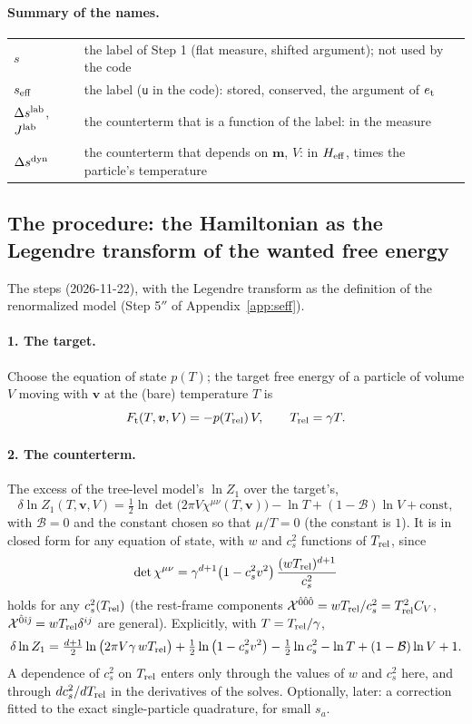 \documentclass[11pt,aps,preprint,nofootinbib,superscriptaddress,tightenlines]{revtex4-2}
\def\st{\begin{equation}}
\def\stp{\end{equation}}
\def\App#1{Appendix~\ref{#1}}
\let\oldparagraph\paragraph
\renewcommand{\paragraph}{\par\bigskip\oldparagraph}
\begin{document}
\paragraph{Summary of the names.}
\begin{center}
\small
\begin{tabular}{ll}
\toprule
$s$ & the label of Step 1 (flat measure, shifted argument); not used by the code \\
$s_{\rm eff}$ & the label (\texttt{u} in the code): stored, conserved, the argument of $e_{\rm t}$ \\
$\Delta s^{\rm lab}$, $J^{\rm lab}$ & the counterterm that is a function of the label: in the measure \\
$\Delta s^{\rm dyn}$ & the counterterm that depends on $\bm m$, $V$: in $H_{\rm eff}$, times the particle's temperature \\
\bottomrule
\end{tabular}
\end{center}

\subsection{The procedure: the Hamiltonian as the Legendre transform of the wanted free energy}
\label{app:procedure}

The steps (2026-11-22), with the Legendre transform as the definition of the renormalized model (Step 5$''$ of \App{app:seff}).

\paragraph{1. The target.}  Choose the equation of state $p(T)$; the target free energy of a particle of volume $V$ moving with $\bm v$ at the (bare) temperature $T$ is
\st
F_{\rm t}(T,\bm v,V)=-p(T_{\rm rel})\,V,\qquad T_{\rm rel}=\gamma T .
\stp

\paragraph{2. The counterterm.}  The excess of the tree-level model's $\ln Z_1$ over the target's,
\st
\delta\ln Z_1(T,\bm v,V)=\tfrac12\ln\det\big(2\pi V\chi^{\mu\nu}(T,\bm v)\big)-\ln T+(1-\mathcal B)\ln V+\text{const},
\stp
with $\mathcal B=0$ and the constant chosen so that $\mu/T=0$ (the constant is $1$).  It is in closed form for any equation of state, with
$w$ and $c_s^2$ functions of $T_{\rm rel}$, since
\st
\det\chi^{\mu\nu}=\gamma^{d+1}\big(1-c_s^2v^2\big)\,\frac{(wT_{\rm rel})^{d+1}}{c_s^2}
\stp
holds for any $c_s^2(T_{\rm rel})$ (the rest-frame components $\mathcal X^{\hat0\hat0\hat0}=wT_{\rm rel}/c_s^2=T_{\rm rel}^2C_V$, $\mathcal X^{\hat0\hat\imath\hat\jmath}=wT_{\rm rel}\delta^{ij}$ are
general).  Explicitly, with $T=T_{\rm rel}/\gamma$,
\st
\delta\ln Z_1=\tfrac{d+1}2\ln\big(2\pi V\gamma\,wT_{\rm rel}\big)+\tfrac12\ln\big(1-c_s^2v^2\big)-\tfrac12\ln c_s^2-\ln T+(1-\mathcal B)\ln V+1 .
\label{dlnZgeneral}
\stp
A dependence of $c_s^2$ on $T_{\rm rel}$ enters only through the values of $w$ and $c_s^2$ here, and through $dc_s^2/dT_{\rm rel}$ in the derivatives of the solves.  Optionally, later: a correction fitted to the exact single-particle quadrature, for small $s_a$.
\end{document}
